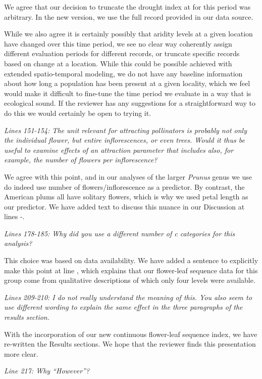 \documentclass{article}[12pt]
\begin{document}
We agree that our decision to truncate the drought index at for this period was arbitrary. In the new version, we use the full record provided in our data source.

While we also agree it is certainly possibly that aridity levels at a given location have changed over this time period, we see no clear way coherently assign different evaluation periods for different records, or truncate specific records based on change at a location. While this could be possible achieved with extended spatio-temporal modeling, we do not have any baseline information about how long a population has been present at a given locality, which we feel would make it difficult to fine-tune the time period we evaluate in a way that is ecological sound. If the reviewer has any suggestions for a straightforward way to do this we would certainly be open to trying it.

\emph{Lines 151-154: The unit relevant for attracting pollinators is probably not only the individual flower, but entire inflorescences, or even trees. Would it thus be useful to examine effects of an attraction parameter that includes also, for example, the number of flowers per inflorescence?}

We agree with this point, and in our analyses of the larger \emph{Prunus} genus we use do indeed use number of flowers/inflorescence as a predictor. By contrast, the American plums all have solitary flowers, which is why we used petal length as our predictor. We have added text to discuss this nuance in our Discussion at lines -.

\emph{Lines 178-185: Why did you use a different number of c categories for this analysis?}

This choice was based on data availability. We have added a sentence to explicitly make this point at line , which explains that our flower-leaf sequence data for this group come from qualitative descriptions of which only four levels were available.

\emph{Lines 209-210: I do not really understand the meaning of this. You also seem to use different wording to explain the same effect in the three paragraphs of the results section.}

With the incorporation of our new continuous flower-leaf sequence index, we have re-written the Results sections. We hope that the reviewer finds this presentation more clear.

\emph{Line 217: Why “However”?}
\end{document}
